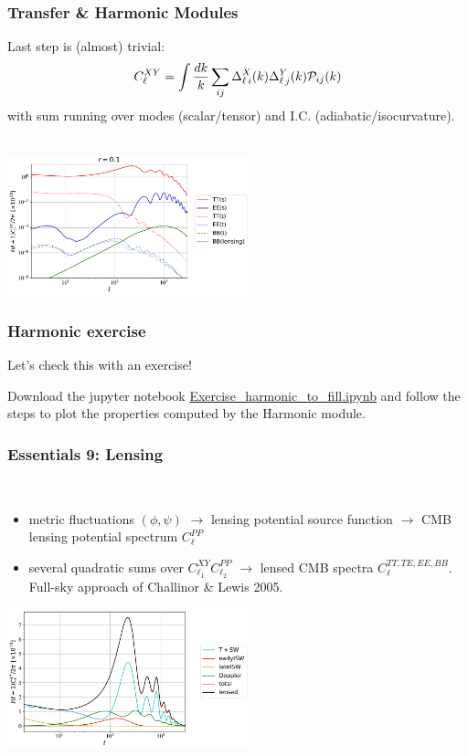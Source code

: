 \begin{frame}[fragile]
\frametitle{Transfer \& Harmonic Modules}

Last step is (almost) trivial:
$$
C_\ell^{XY} = \int \frac{dk}{k}  \sum_{ij}  \Delta^X_{\ell \, i}(k)  \Delta^Y_{\ell \, j}(k) {\cal P}_{ij}(k)  
$$
with sum running over modes (scalar/tensor) and I.C. (adiabatic/isocurvature).\\
\mbox{} \\
\begin{center}
\includegraphics[width=7cm,angle=0]{Figures/cl_ST.pdf}
\end{center}

\end{frame}

\begin{frame}[fragile]
	\frametitle{Harmonic exercise}
Let's check this with an exercise!

Download the jupyter notebook \href{https://github.com/MarkMos/class_lecture/blob/main/notebooks/Exercise_harmonic_to_fill.ipynb}{Exercise\_harmonic\_to\_fill.ipynb} and follow the steps to plot the properties computed by the Harmonic module.


\end{frame}

\begin{frame}[fragile]
\frametitle{Essentials 9: Lensing}

\mbox{}\\
\begin{itemize}
\item
metric fluctuations $(\phi, \psi)$ $\rightarrow$ lensing potential source function $\rightarrow$ CMB lensing potential spectrum $C_\ell^{PP}$\\
\item
several quadratic sums over $C_{\ell_1}^{XY} C_{\ell_2}^{PP}$  $\rightarrow$ lensed CMB spectra $C_\ell^{TT,TE,EE,BB}$. Full-sky approach of Challinor \& Lewis 2005.
\end{itemize}
\begin{center}
	\includegraphics[width=7cm,angle=0]{Figures/cltt_terms.pdf}
\end{center}

\end{frame}



